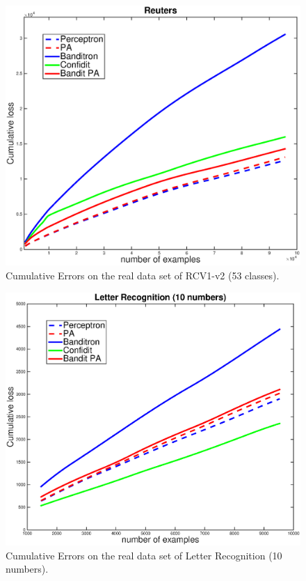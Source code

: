 \begin{figure}[h!]
\label{pic:BPARCV}
\centerline{
\includegraphics[scale = 0.4]{fig05/mc/RCV1_v2_53class.eps}}
\caption{Cumulative Errors on the real data set of RCV1-v2 (53 classes).}
\end{figure}

\begin{figure}[h!]
\centerline{
\includegraphics[scale = 0.4]{fig05/mc/10LR.eps}}
\caption{Cumulative Errors on the real data set of Letter Recognition (10 numbers).}
\label{pic:BPALR10}
\end{figure}

